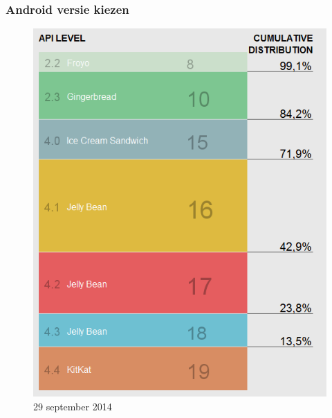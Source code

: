 \documentclass[11pt]{beamer}
\begin{document}
\begin{frame}
\frametitle{Android versie kiezen}
\begin{figure}
\centering
\includegraphics[height=.75\textheight]{./apilevel1}
\caption{29 september 2014}
\label{fig:apilevel1}
\end{figure}
\end{frame}
\end{document}
